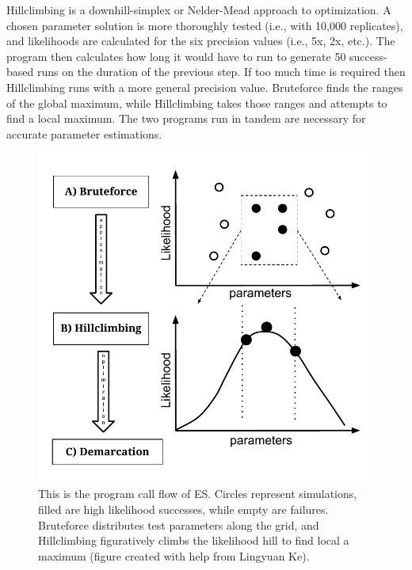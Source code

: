 Hillclimbing is a downhill-simplex or Nelder-Mead approach to optimization.
A chosen parameter solution is more thoroughly tested (i.e., with 10,000 replicates), and likelihoods are calculated for the six precision values (i.e., 5x, 2x, etc.).
The program then calculates how long it would have to run to generate 50 success-based runs on the duration of the previous step.
If too much time is required then Hillclimbing runs with a more general precision value.
Bruteforce finds the ranges of the global maximum, while Hillclimbing takes those ranges and attempts to find a local maximum.
The two programs run in tandem are necessary for accurate parameter estimations.


\begin{figure}[h!]
 \centering
 \includegraphics[scale=0.75]{images/ESFlow-CH2.pdf}
 \caption[Ecotype Simulation program flow diagram.]{This is the program call flow of ES. Circles represent simulations, filled are high likelihood successes, while empty are failures. Bruteforce distributes test parameters along the grid, and Hillclimbing figuratively climbs the likelihood hill to find local a maximum (figure created with help from Lingyuan Ke). }
 \label{fig:Flow}
\end{figure}

